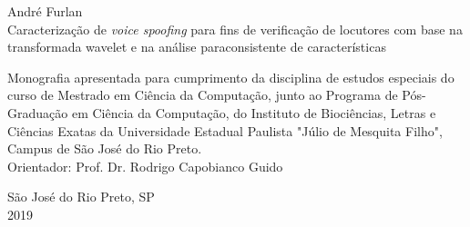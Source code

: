 \documentclass[a4paper,12pt,openright,oneside]{book}
\begin{document}
	\newpage
	\thispagestyle{empty}
	\setcounter{page}{1}
	\begin{center}
		\vspace{4cm}
		\fontsize{14}{\baselineskip} \selectfont
		\vspace{30.0pt}
		{André Furlan} \\ \vspace{30.0pt}
		{Caracterização de \textit{voice spoofing} para fins de verificação de locutores com base na transformada wavelet e na análise paraconsistente de características} \\ \onehalfspacing \fontsize{14}{\baselineskip}
		\par \null
		\begin{flushright}
		\parbox{3.50in}{
			\fontsize{12}{\baselineskip} \selectfont \onehalfspacing
			Monografia apresentada para cumprimento da disciplina de estudos especiais do curso de Mestrado em Ciência da Computação, junto ao Programa de Pós-Graduação em Ciência da Computação, do Instituto de Biociências, Letras e Ciências Exatas da Universidade Estadual Paulista "Júlio de Mesquita Filho", Campus de São José do Rio Preto. \\ \vspace{1.0pt}
			{Orientador: Prof. Dr. Rodrigo Capobianco Guido } \\ \vspace{1.0pt}
		}
		\end{flushright}
		\fontsize{14}{\baselineskip} \selectfont
		\vspace{8.0cm}
		São José do Rio Preto, SP \\ \vspace{1.0pt}  
		2019
	\end{center}
	\newpage
	\thispagestyle{empty}
\end{document}
